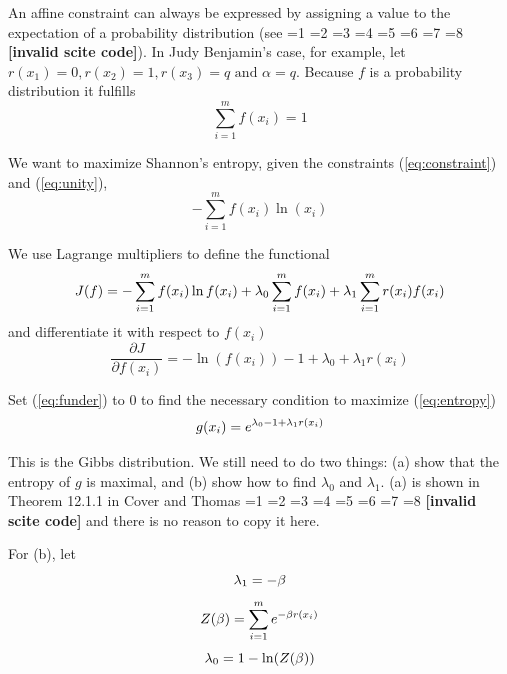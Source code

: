 \documentclass[12pt]{article}
\newif\ifNumericalOrYear
\newcommand{\PageP}{p.~}
\newcommand{\PageP}{}
\newcommand{\scite}[3]{\ifnum#1=1\ifNumericalOrYear\citep{#2}\else\citeyearpar{#2}\fi\else
\ifnum#1=2\ifNumericalOrYear\citep[#3]{#2}\else\citep[{\PageP}#3]{#2}\fi\else
\ifnum#1=3\ifNumericalOrYear(\citet[#3]{#2})\else\citep[{\PageP}#3]{#2}\fi\else
\ifnum#1=4\ifNumericalOrYear\citet{#2}\else\citet{#2}\fi\else
\ifnum#1=5\ifNumericalOrYear(\citet{#2})\else\citep{#2}\fi\else
\ifnum#1=6\ifNumericalOrYear(\citet[#3]{#2})\else\citep[{\PageP}#3]{#2}\fi\else
\ifnum#1=7\ifNumericalOrYear\citep{#2}\else\citealp{#2}\fi\else
\ifnum#1=8\ifNumericalOrYear\citep[#3]{#2}\else\citealp[{\PageP}#3]{#2}\fi\else
\textbf{[invalid scite code]}\fi\fi\fi\fi\fi\fi\fi\fi}
\begin{document}
An affine constraint can always be expressed by assigning a value to
the expectation of a probability distribution (see
\scite{7}{hobson71}{}). In Judy Benjamin's case, for example, let
$r(x_{1})=0, r(x_{2})=1, r(x_{3})=q\mbox{ and }\alpha=q$. Because $f$
is a probability distribution it fulfills
\begin{equation}
  \label{eq:unity}
\sum_{i=1}^{m}f(x_{i})=1
\end{equation}

We want to maximize Shannon's entropy, given the constraints
({\ref{eq:constraint}}) and ({\ref{eq:unity}}),
\begin{equation}
  \label{eq:entropy}
-\sum_{i=1}^{m}f(x_{i})\ln(x_{i})
\end{equation}

We use Lagrange multipliers to define the functional
\begin{equation}
  \label{eq:functional}
J(f)=-\sum_{i=1}^{m}f(x_{i})\ln{}f(x_{i})+\lambda_{0}\sum_{i=1}^{m}f(x_{i})+\lambda_{1}\sum_{i=1}^{m}r(x_{i})f(x_{i})\notag
\end{equation}
and differentiate it with respect to $f(x_{i})$
\begin{equation}
  \label{eq:funder}
\frac{\partial{}J}{\partial{}f(x_{i})}=-\ln(f(x_{i}))-1+\lambda_{0}+\lambda_{1}r(x_{i})
\end{equation}

Set ({\ref{eq:funder}}) to $0$ to find the necessary condition to
maximize ({\ref{eq:entropy}})
\begin{equation}
  \label{eq:coverthomas}
g(x_{i})=e^{\lambda_{0}-1+\lambda_{1}r(x_{i})}\notag
\end{equation}

This is the Gibbs distribution. We still need to do two things: (a)
show that the entropy of $g$ is maximal, and (b) show how to find
$\lambda_{0}$ and $\lambda_{1}$. (a) is shown in Theorem 12.1.1 in
Cover and Thomas \scite{1}{coverthomas06}{} and there is no reason to
copy it here. 

For (b), let
\begin{equation}
  \label{eq:l1}
\lambda_{1}=-\beta\notag
\end{equation}
\begin{equation}
  \label{eq:zet}
Z(\beta)=\sum_{i=1}^{m}e^{-\beta{}r(x_{i})}\notag
\end{equation}
\begin{equation}
  \label{eq:l0}
\lambda_{0}=1-\ln(Z(\beta))\notag
\end{equation}
\end{document}

